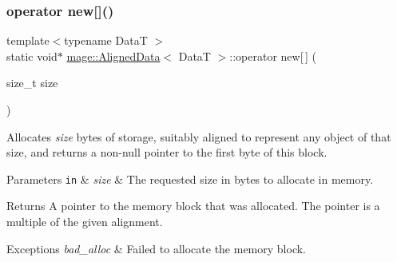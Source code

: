 \subsubsection{\texorpdfstring{operator new[]()}{operator new[]()}}
{\footnotesize\ttfamily template$<$typename DataT $>$ \\
static void$\ast$ \hyperlink{structmage_1_1_aligned_data}{mage\+::\+Aligned\+Data}$<$ DataT $>$\+::operator new\mbox{[}$\,$\mbox{]} (\begin{DoxyParamCaption}\item[{size\+\_\+t}]{size }\end{DoxyParamCaption})\hspace{0.3cm}{\ttfamily [static]}}

Allocates {\itshape size} bytes of storage, suitably aligned to represent any object of that size, and returns a non-\/null pointer to the first byte of this block.


\begin{DoxyParams}[1]{Parameters}
\mbox{\tt in}  & {\em size} & The requested size in bytes to allocate in memory. \\
\hline
\end{DoxyParams}
\begin{DoxyReturn}{Returns}
A pointer to the memory block that was allocated. The pointer is a multiple of the given alignment. 
\end{DoxyReturn}

\begin{DoxyExceptions}{Exceptions}
{\em bad\+\_\+alloc} & Failed to allocate the memory block. \\
\hline
\end{DoxyExceptions}
